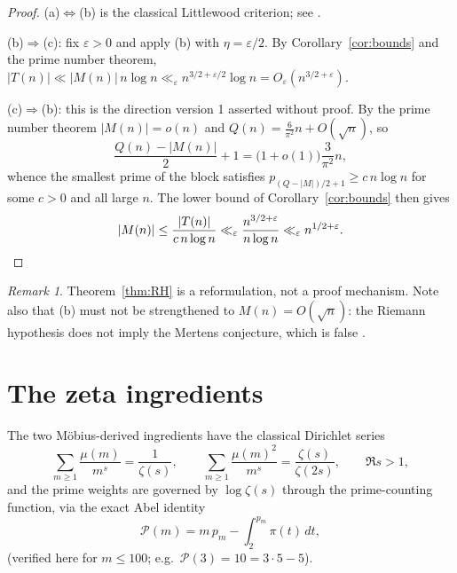 \documentclass[11pt]{amsart}
\numberwithin{equation}{section}
\theoremstyle{plain}
\theoremstyle{definition}
\theoremstyle{remark}
\newtheorem{remark}[theorem]{Remark}
\newcommand{\mob}{\mu}
\newcommand{\Mert}{M}
\newcommand{\Sq}{Q}
\newcommand{\PS}{\mathcal P}
\begin{document}
\begin{proof}
(a)$\iff$(b) is the classical Littlewood criterion; see \cite{Littlewood1912,Titchmarsh1986}.

(b)$\Rightarrow$(c): fix $\varepsilon>0$ and apply (b) with
$\eta=\varepsilon/2$. By Corollary~\ref{cor:bounds} and the prime number theorem,
$|T(n)|\ll |\Mert(n)|\,n\log n\ll_{\varepsilon}
 n^{3/2+\varepsilon/2}\log n=O_{\varepsilon}(n^{3/2+\varepsilon})$.

(c)$\Rightarrow$(b): this is the direction version 1 asserted without proof. By
the prime number theorem $|\Mert(n)|=o(n)$ and $\Sq(n)=\tfrac6{\pi^2}n+O(\sqrt
n)$, so
\begin{equation}
\label{eq:smallest-block-index}
\frac{\Sq(n)-|\Mert(n)|}{2}+1=\bigl(1+o(1)\bigr)\frac{3}{\pi^2}n ,
\end{equation}
whence the smallest prime of the block satisfies
$p_{(\Sq-|\Mert|)/2+1}\ge c\,n\log n$ for some $c>0$ and all large $n$. The
lower bound of Corollary~\ref{cor:bounds} then gives
\begin{equation}
\label{eq:reverse-mertens-bound}
|\Mert(n)|\le \frac{|T(n)|}{c\,n\log n}
\ll_\varepsilon \frac{n^{3/2+\varepsilon}}{n\log n}
\ll_\varepsilon n^{1/2+\varepsilon}. \qedhere
\end{equation}
\end{proof}

\begin{remark}
\label{rem:rh-reformulation}
Theorem~\ref{thm:RH} is a reformulation, not a proof mechanism. Note also that
(b) must not be strengthened to $\Mert(n)=O(\sqrt n)$: the Riemann hypothesis
does not imply the Mertens conjecture, which is false \cite{OdlyzkoTeRiele1985}.
\end{remark}

\section{The zeta ingredients}
\label{sec:zeta-ingredients}

The two M\"obius-derived ingredients have the classical Dirichlet series \cite{Apostol1976}
\begin{equation}
\label{eq:dirichlet-series}
\sum_{m\ge1}\frac{\mob(m)}{m^s}=\frac1{\zeta(s)},
\qquad
\sum_{m\ge1}\frac{\mob(m)^2}{m^s}=\frac{\zeta(s)}{\zeta(2s)},
\qquad \Re s>1,
\end{equation}
and the prime weights are governed by $\log\zeta(s)$ through the prime-counting
function, via the exact Abel identity
\begin{equation}
\label{eq:abel-prime-sum}
\PS(m)=m\,p_m-\int_2^{p_m}\pi(t)\,dt ,
\end{equation}
(verified here for $m\le100$; e.g.\ $\PS(3)=10=3\cdot5-5$).
\end{document}
